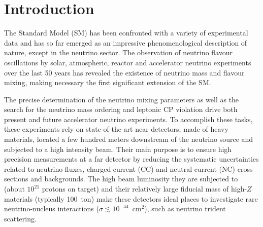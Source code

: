\graphicspath{{}{tridentSM/figs/}{tridentSM/}}

\section{Introduction}
\label{sec:intro}

The Standard Model (SM) has been confronted with a variety of experimental data and has so far emerged as an impressive phenomenological description of nature, except in the neutrino sector. The observation of neutrino flavour oscillations by solar, atmospheric, reactor and accelerator neutrino experiments over the last 50 years has revealed the existence of neutrino mass and flavour mixing, making necessary the first significant extension of the SM.

The precise determination of the neutrino mixing parameters as well as the search for the neutrino mass ordering and leptonic CP violation drive both present and future accelerator neutrino experiments. To accomplish these tasks, these experiments rely on state-of-the-art near detectors, made of heavy materials, located a few hundred meters downstream of the neutrino source and subjected to a high intensity beam. Their main purpose is to ensure high precision measurements at a far detector by reducing the systematic uncertainties related to neutrino fluxes, charged-current (CC) and neutral-current (NC) cross sections and backgrounds.  
%
The high beam luminosity they are subjected to (about $10^{21}$ protons on target) and their relatively large fiducial mass of high-$Z$ materials (typically 100~ton) make these detectors ideal places to investigate rare neutrino-nucleus interactions ($\sigma\lesssim 10^{-44}$~cm${}^2$), such as neutrino trident scattering. 

